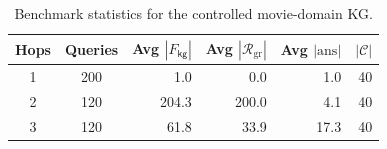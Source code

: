 \begin{table}[t]
\centering
\caption{Benchmark statistics for the controlled movie-domain KG.}
\label{tab:benchmark_stats}
\small
\begin{tabular}{ccrrrr}
\toprule
Hops & Queries & Avg $|F_{\mathsf{kg}}|$ & Avg $|\mathcal{R}_{\mathrm{gr}}|$ & Avg $|\mathrm{ans}|$ & $|\mathcal{C}|$ \\
\midrule
1 & 200 & 1.0 & 0.0 & 1.0 & 40 \\
2 & 120 & 204.3 & 200.0 & 4.1 & 40 \\
3 & 120 & 61.8 & 33.9 & 17.3 & 40 \\
\bottomrule
\end{tabular}
\end{table}